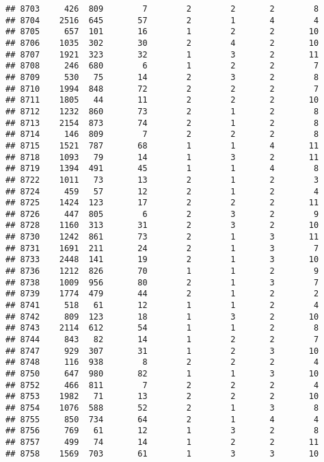 \documentclass[]{article}
\begin{document}
\begin{verbatim}
## 8703     426  809        7        2        2       2        8
## 8704    2516  645       57        2        1       4        4
## 8705     657  101       16        1        2       2       10
## 8706    1035  302       30        2        4       2       10
## 8707    1921  323       32        1        3       2       11
## 8708     246  680        6        1        2       2        7
## 8709     530   75       14        2        3       2        8
## 8710    1994  848       72        2        2       2        7
## 8711    1805   44       11        2        2       2       10
## 8712    1232  860       73        2        1       2        8
## 8713    2154  873       74        2        1       2        8
## 8714     146  809        7        2        2       2        8
## 8715    1521  787       68        1        1       4       11
## 8718    1093   79       14        1        3       2       11
## 8719    1394  491       45        1        1       4        8
## 8722    1011   73       13        2        1       2        3
## 8724     459   57       12        2        1       2        4
## 8725    1424  123       17        2        2       2       11
## 8726     447  805        6        2        3       2        9
## 8728    1160  313       31        2        3       2       10
## 8730    1242  861       73        2        1       3       11
## 8731    1691  211       24        2        1       3        7
## 8733    2448  141       19        2        1       3       10
## 8736    1212  826       70        1        1       2        9
## 8738    1009  956       80        2        1       3        7
## 8739    1774  479       44        2        1       2        2
## 8741     518   61       12        1        1       2        4
## 8742     809  123       18        1        3       2       10
## 8743    2114  612       54        1        1       2        8
## 8744     843   82       14        1        2       2        7
## 8747     929  307       31        1        2       3       10
## 8748     116  938        8        2        2       2        4
## 8750     647  980       82        1        1       3       10
## 8752     466  811        7        2        2       2        4
## 8753    1982   71       13        2        2       2       10
## 8754    1076  588       52        2        1       3        8
## 8755     850  734       64        2        1       4        4
## 8756     769   61       12        1        3       2        8
## 8757     499   74       14        1        2       2       11
## 8758    1569  703       61        1        3       3       10

\end{verbatim}
\end{document}
